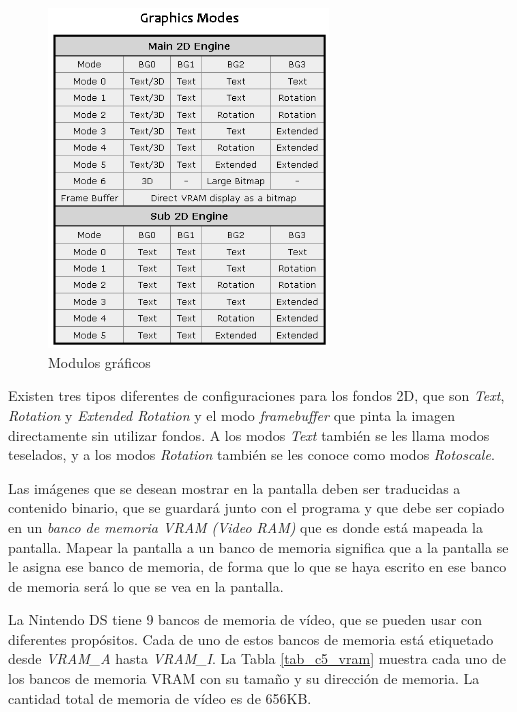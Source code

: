 \begin{figure}[t]
	\centering
	\includegraphics[height=9cm]{Figuras/C5/c5_modos-graficos.png}
	\caption{Modulos gráficos}
	\label{fig_c5_modulos}
\end{figure}

Existen tres tipos diferentes de configuraciones para los fondos 2D, que son \textit{Text}, \textit{Rotation} y \textit{Extended Rotation} y el modo \textit{framebuffer} que pinta la imagen directamente sin utilizar fondos. A los modos \textit{Text} también se les llama modos teselados, y a los modos \textit{Rotation} también se les conoce como modos \textit{Rotoscale}.

Las imágenes que se desean mostrar en la pantalla deben ser traducidas a contenido binario, que se guardará junto con el programa y que debe ser copiado en un \textit{banco de memoria VRAM (Video RAM)} que es donde está mapeada la pantalla. Mapear la pantalla a un banco de memoria significa que a la pantalla se le asigna ese banco de memoria, de forma que lo que se haya escrito en ese banco de memoria será lo que se vea en la pantalla. 

La Nintendo DS tiene 9 bancos de memoria de vídeo, que se pueden usar con diferentes propósitos. Cada de uno de estos bancos de memoria está etiquetado desde \textit{VRAM\_A} hasta \textit{VRAM\_I}. La Tabla \ref{tab_c5_vram} muestra cada uno de los bancos de memoria VRAM con su tamaño y su dirección de memoria. La cantidad total de memoria de vídeo es de 656KB. 

